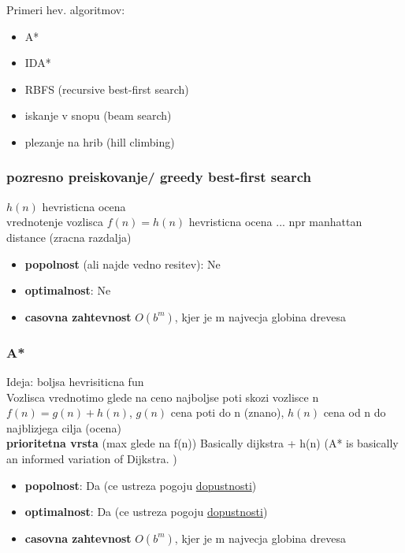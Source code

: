 Primeri hev. algoritmov:
\begin{itemize}[noitemsep,topsep=0pt,leftmargin=*]
    \item A*
    \item IDA*
    \item RBFS (recursive best-first search)
    \item iskanje v snopu (beam search)
    \item plezanje na hrib (hill climbing)
\end{itemize}


\subsubsection{pozresno preiskovanje/ greedy best-first search}
$h(n)$ hevristicna ocena\\
vrednotenje vozlisca $f(n)=h(n)$
hevristicna ocena ... npr manhattan distance (zracna razdalja)

\begin{itemize}[noitemsep,topsep=0pt,leftmargin=*]
    \item \textbf{popolnost} (ali najde vedno resitev): Ne
    \item \textbf{optimalnost}: Ne
    \item \textbf{casovna zahtevnost} $O(b^m)$, kjer je m najvecja globina drevesa
\end{itemize}

\subsubsection{A*}
Ideja: boljsa hevrisiticna fun\\
Vozlisca vrednotimo glede na ceno najboljse poti skozi vozlisce n\\
$f(n)=g(n)+h(n)$, $g(n)$ cena poti do n (znano), $h(n)$ cena od n do najblizjega cilja (ocena)\\
\textbf{prioritetna vrsta} (max glede na f(n))
Basically dijkstra + h(n) (A* is basically an informed variation of Dijkstra.
)
\begin{itemize}[noitemsep,topsep=0pt,leftmargin=*]
    \item \textbf{popolnost}: Da (ce ustreza pogoju \underline{dopustnosti})
    \item \textbf{optimalnost}: Da (ce ustreza pogoju \underline{dopustnosti}) 
    \item \textbf{casovna zahtevnost} $O(b^m)$, kjer je m najvecja globina drevesa
\end{itemize}

